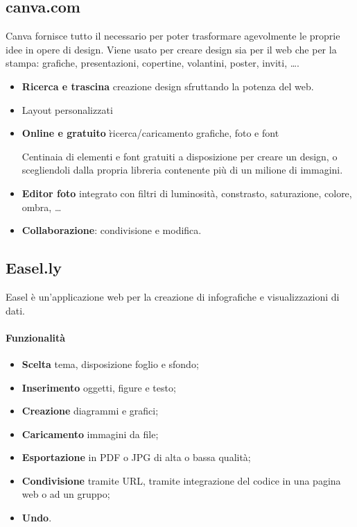 \subsection{canva.com}
Canva fornisce tutto il necessario per poter trasformare agevolmente le proprie idee in opere di design.
Viene usato per creare design sia per il web che per la stampa: grafiche, presentazioni, copertine, volantini, poster, inviti, \dots.
\begin{itemize}
 \item \textbf{Ricerca e trascina} creazione design sfruttando la potenza del web. 
 \item Layout personalizzati 
 \item \textbf{Online e gratuito}
 \`ricerca/caricamento grafiche, foto e font 
 
 Centinaia di elementi e font gratuiti a disposizione per creare un design, 
 o scegliendoli dalla propria libreria contenente più di un milione di immagini.  
 \item \textbf{Editor foto} integrato con
 filtri di luminosità, constrasto, saturazione, colore, ombra, \dots
 \item \textbf{Collaborazione}: condivisione e modifica.
\end{itemize}
\subsection{Easel.ly}
Easel è un'applicazione web per la creazione di infografiche e visualizzazioni di dati.

\paragraph{Funzionalità}
\begin{itemize}
\item \textbf{Scelta} tema, disposizione foglio e sfondo;
\item \textbf{Inserimento} oggetti, figure e testo;
\item \textbf{Creazione} diagrammi e grafici;
\item \textbf{Caricamento} immagini da file;
\item \textbf{Esportazione} in PDF o JPG di alta o bassa qualità;
\item \textbf{Condivisione} tramite URL, tramite integrazione del codice in una pagina web o ad un gruppo;
\item \textbf{Undo}.
\end{itemize}

